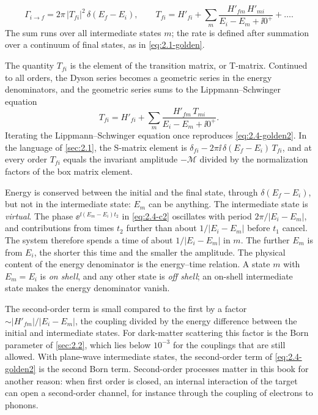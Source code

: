 \begin{keyresult}
\begin{equation}
  \varGamma_{i\to f} = 2\pi\,|T_{fi}|^2\,\delta(E_f - E_i), \qquad
  T_{fi} = H'_{fi} + \sum_m\frac{H'_{fm}\,H'_{mi}}{E_i - E_m + \ii0^+} + \dots .
  \label{eq:2.4-golden2}
\end{equation}
The sum runs over all intermediate states $m$; the rate is defined after summation over a continuum of final states, as in \cref{eq:2.1-golden}.
\end{keyresult}

The quantity $T_{fi}$ is the element of the transition matrix, or T-matrix. Continued to all orders, the Dyson series becomes a geometric series in the energy denominators, and the geometric series sums to the Lippmann--Schwinger equation~\cite[Chap.~6]{sakurai2017modern}
\begin{equation}
  T_{fi} = H'_{fi} + \sum_m\frac{H'_{fm}\,T_{mi}}{E_i - E_m + \ii0^+} .
  \label{eq:2.4-LS}
\end{equation}
Iterating the Lippmann--Schwinger equation once reproduces \cref{eq:2.4-golden2}. In the language of \cref{sec:2.1}, the S-matrix element is $\delta_{fi} - 2\pi\ii\,\delta(E_f - E_i)\,T_{fi}$, and at every order $T_{fi}$ equals the invariant amplitude $-\mathcal{M}$ divided by the normalization factors of the box matrix element.

Energy is conserved between the initial and the final state, through $\delta(E_f - E_i)$, but not in the intermediate state: $E_m$ can be anything. The intermediate state is \emph{virtual}. The phase $\ee^{\ii(E_m - E_i)t_2}$ in \cref{eq:2.4-c2} oscillates with period $2\pi/|E_i - E_m|$, and contributions from times $t_2$ further than about $1/|E_i - E_m|$ before $t_1$ cancel. The system therefore spends a time of about $1/|E_i - E_m|$ in $m$. The further $E_m$ is from $E_i$, the shorter this time and the smaller the amplitude. The physical content of the energy denominator is the energy--time relation. A state $m$ with $E_m = E_i$ is \emph{on shell}, and any other state is \emph{off shell}; an on-shell intermediate state makes the energy denominator vanish.

The second-order term is small compared to the first by a factor $\sim|H'_{fm}|/|E_i - E_m|$, the coupling divided by the energy difference between the initial and intermediate states. For dark-matter scattering this factor is the Born parameter of \cref{sec:2.2}, which lies below $10^{-3}$ for the couplings that are still allowed. With plane-wave intermediate states, the second-order term of \cref{eq:2.4-golden2} is the second Born term. Second-order processes matter in this book for another reason: when first order is closed, an internal interaction of the target can open a second-order channel, for instance through the coupling of electrons to phonons.

